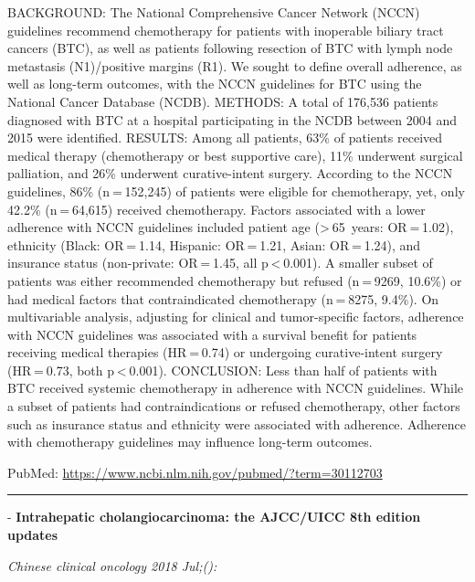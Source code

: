 \documentclass[]{article}
\begin{document}
BACKGROUND: The National Comprehensive Cancer Network (NCCN) guidelines
recommend chemotherapy for patients with inoperable biliary tract
cancers (BTC), as well as patients following resection of BTC with lymph
node metastasis (N1)/positive margins (R1). We sought to define overall
adherence, as well as long-term outcomes, with the NCCN guidelines for
BTC using the National Cancer Database (NCDB). METHODS: A total of
176,536 patients diagnosed with BTC at a hospital participating in the
NCDB between 2004 and 2015 were identified. RESULTS: Among all patients,
63\% of patients received medical therapy (chemotherapy or best
supportive care), 11\% underwent surgical palliation, and 26\% underwent
curative-intent surgery. According to the NCCN guidelines, 86\%
(n = 152,245) of patients were eligible for chemotherapy, yet, only
42.2\% (n = 64,615) received chemotherapy. Factors associated with a
lower adherence with NCCN guidelines included patient age
(\textgreater{} 65~years: OR = 1.02), ethnicity (Black: OR = 1.14,
Hispanic: OR = 1.21, Asian: OR = 1.24), and insurance status
(non-private: OR = 1.45, all p \textless{} 0.001). A smaller subset of
patients was either recommended chemotherapy but refused (n = 9269,
10.6\%) or had medical factors that contraindicated chemotherapy
(n = 8275, 9.4\%). On multivariable analysis, adjusting for clinical and
tumor-specific factors, adherence with NCCN guidelines was associated
with a survival benefit for patients receiving medical therapies
(HR = 0.74) or undergoing curative-intent surgery (HR = 0.73, both
p \textless{} 0.001). CONCLUSION: Less than half of patients with BTC
received systemic chemotherapy in adherence with NCCN guidelines. While
a subset of patients had contraindications or refused chemotherapy,
other factors such as insurance status and ethnicity were associated
with adherence. Adherence with chemotherapy guidelines may influence
long-term outcomes.

PubMed: \url{https://www.ncbi.nlm.nih.gov/pubmed/?term=30112703}

{}

{}

\begin{center}\rule{0.5\linewidth}{\linethickness}\end{center}

 - \textbf{Intrahepatic cholangiocarcinoma: the AJCC/UICC 8th edition
updates}

\emph{Chinese clinical oncology 2018 Jul;():}
\end{document}

